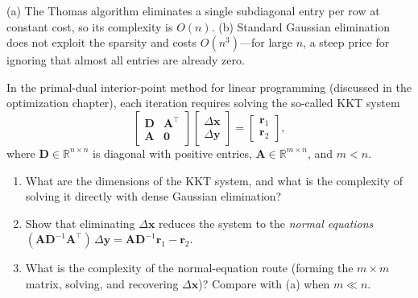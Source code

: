 \begin{solution}
    (a) The Thomas algorithm eliminates a single subdiagonal entry per row at constant cost, so its complexity is $O(n)$. (b) Standard Gaussian elimination does not exploit the sparsity and costs $O(n^3)$---for large $n$, a steep price for ignoring that almost all entries are already zero.
\end{solution}

\begin{exercise} %
    In the primal-dual interior-point method for linear programming (discussed in the optimization chapter), each iteration requires solving the so-called KKT system
    \begin{equation*}
        \begin{bmatrix} \mathbf{D} & \mathbf{A}^\top \\ \mathbf{A} & \mathbf{0} \end{bmatrix}
        \begin{bmatrix} \Delta\mathbf{x} \\ \Delta\mathbf{y} \end{bmatrix}
        =
        \begin{bmatrix} \mathbf{r}_1 \\ \mathbf{r}_2 \end{bmatrix},
    \end{equation*}
    where $\mathbf{D} \in \mathbb{R}^{n \times n}$ is diagonal with positive entries, $\mathbf{A} \in \mathbb{R}^{m \times n}$, and $m < n$.
    \begin{enumerate}[label=(\alph*)]
        \item What are the dimensions of the KKT system, and what is the complexity of solving it directly with dense Gaussian elimination?
        \item Show that eliminating $\Delta\mathbf{x}$ reduces the system to the \emph{normal equations} $(\mathbf{A}\mathbf{D}^{-1}\mathbf{A}^\top)\, \Delta\mathbf{y} = \mathbf{A}\mathbf{D}^{-1}\mathbf{r}_1 - \mathbf{r}_2$.
        \item What is the complexity of the normal-equation route (forming the $m \times m$ matrix, solving, and recovering $\Delta\mathbf{x}$)? Compare with (a) when $m \ll n$.
    \end{enumerate}
\end{exercise}

